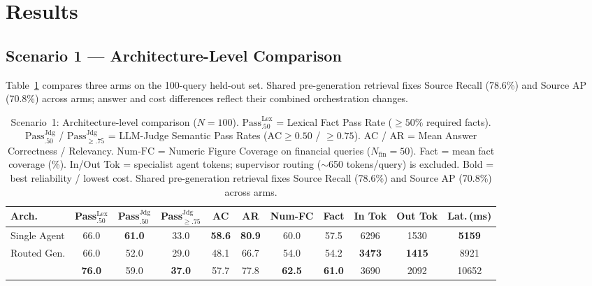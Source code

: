 \section{Results}
\label{sec:results}

\subsection{Scenario 1 --- Architecture-Level Comparison}
\label{sec:s1_results}

Table~\ref{tab:arch_comparison} compares three arms on the 100-query held-out set. Shared pre-generation retrieval fixes Source Recall (78.6\%) and Source AP (70.8\%) across arms; answer and cost differences reflect their combined orchestration changes.

\begin{table}[!htbp]
\centering
\caption{Scenario~1: Architecture-level comparison ($N=100$). $\text{Pass}_{.50}^{\text{Lex}}$ = Lexical Fact Pass Rate ($\ge 50\%$ required facts). $\text{Pass}_{.50}^{\text{Jdg}}$ / $\text{Pass}_{\ge .75}^{\text{Jdg}}$ = LLM-Judge Semantic Pass Rates ($\text{AC} \ge 0.50$ / $\ge 0.75$). $\text{AC}$ / $\text{AR}$ = Mean Answer Correctness / Relevancy. $\text{Num-FC}$ = Numeric Figure Coverage on financial queries ($N_{\text{fin}}=50$). Fact = mean fact coverage (\%). In/Out Tok = specialist agent tokens; supervisor routing ($\sim$650 tokens/query) is excluded. Bold = best reliability / lowest cost. Shared pre-generation retrieval fixes Source Recall (78.6\%) and Source AP (70.8\%) across arms.}
\label{tab:arch_comparison}
{\footnotesize\setlength{\tabcolsep}{1.6pt}
\begin{tabular}{lcccccccccc}
\toprule
\textbf{Arch.} & \textbf{Pass$_{.50}^{\text{Lex}}$} & \textbf{Pass$_{.50}^{\text{Jdg}}$} & \textbf{Pass$_{\ge .75}^{\text{Jdg}}$} & \textbf{AC} & \textbf{AR} & \textbf{Num-FC} & \textbf{Fact} & \textbf{In Tok} & \textbf{Out Tok} & \textbf{Lat.\,(ms)} \\
\midrule
Single Agent   & 66.0 & \textbf{61.0} & 33.0 & \textbf{58.6} & \textbf{80.9} & 60.0 & 57.5 & 6296 & 1530 & \textbf{5159} \\
Routed Gen.    & 66.0 & 52.0 & 29.0 & 48.1 & 66.7 & 54.0 & 54.2 & \textbf{3473} & \textbf{1415} & 8921 \\
\textbf{\system{}} & \textbf{76.0} & 59.0 & \textbf{37.0} & 57.7 & 77.8 & \textbf{62.5} & \textbf{61.0} & 3690 & 2092 & 10652 \\
\bottomrule
\end{tabular}}
\end{table}

